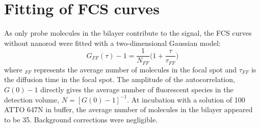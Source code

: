 \documentclass[11pt,a4paper,onecolumn]{article}
\begin{document}
\section{Fitting of FCS curves}
As only probe molecules in the bilayer contribute to the signal, the FCS curves without nanorod were fitted with a two-dimensional Gaussian model:
\begin{equation}
	G_{FF}(\tau)-1 = \frac{1}{N_{FF}}\Bigg(1+\frac{\tau}{\tau_{FF}}\Bigg)
	\label{eq:2Dgauss}
\end{equation}
where $_{FF}$ represents the average number of molecules in the focal spot and $\tau_{FF}$ is the diffusion time in the focal spot.
The amplitude of the autocorrelation, $G(0)-1$ directly gives the average number of fluorescent species in the detection volume, $N=[G(0)-1]^{-1}$.
At incubation with a solution of \SI{100}{\nM} ATTO 647N in buffer, the average number of molecules in the bilayer appeared to be 35.
Background corrections were negligible.\\
\end{document}
